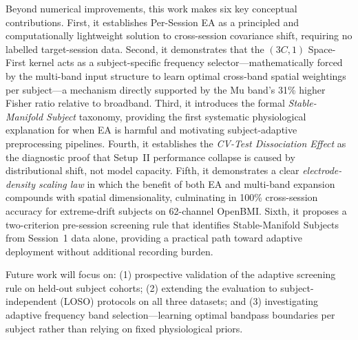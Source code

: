 \documentclass[conference]{IEEEtran}
\begin{document}
Beyond numerical improvements, this work makes six key conceptual contributions. First, it establishes Per-Session EA as a principled and computationally lightweight solution to cross-session covariance shift, requiring no labelled target-session data. Second, it demonstrates that the $(3C, 1)$ Space-First kernel acts as a subject-specific frequency selector---mathematically forced by the multi-band input structure to learn optimal cross-band spatial weightings per subject---a mechanism directly supported by the Mu band's 31\% higher Fisher ratio relative to broadband. Third, it introduces the formal \textit{Stable-Manifold Subject} taxonomy, providing the first systematic physiological explanation for when EA is harmful and motivating subject-adaptive preprocessing pipelines. Fourth, it establishes the \textit{CV-Test Dissociation Effect} as the diagnostic proof that Setup~II performance collapse is caused by distributional shift, not model capacity. Fifth, it demonstrates a clear \textit{electrode-density scaling law} in which the benefit of both EA and multi-band expansion compounds with spatial dimensionality, culminating in 100\% cross-session accuracy for extreme-drift subjects on 62-channel OpenBMI. Sixth, it proposes a two-criterion pre-session screening rule that identifies Stable-Manifold Subjects from Session~1 data alone, providing a practical path toward adaptive deployment without additional recording burden.

Future work will focus on: (1) prospective validation of the adaptive screening rule on held-out subject cohorts; (2) extending the evaluation to subject-independent (LOSO) protocols on all three datasets; and (3) investigating adaptive frequency band selection---learning optimal bandpass boundaries per subject rather than relying on fixed physiological priors.
\end{document}
